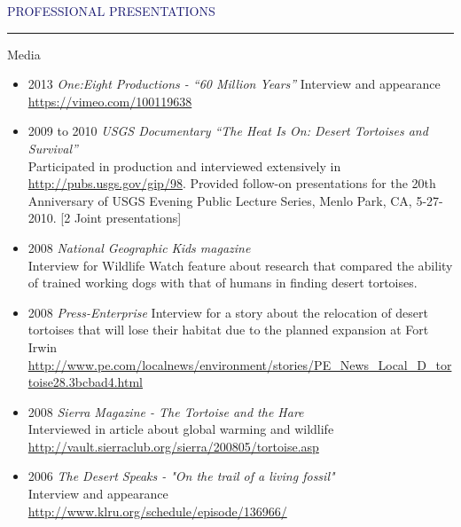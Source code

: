 \documentclass{resume} %
\renewenvironment{rSection}[1]{
\sectionskip
\textcolor{MidnightBlue}{\MakeUppercase{#1}}
\sectionlineskip
\hrule
\begin{list}{}{
\setlength{\leftmargin}{1.5em}
}
\item[]
}{
\end{list}
}
\begin{document}
\begin{rSection}{Professional Presentations}
\begin{rSubsection}{Media}{}{}{}
\begin{itemize}
\item 2013 \textit{One:Eight Productions - “60 Million Years”} Interview and appearance \\
\url{https://vimeo.com/100119638}
\item 2009 to 2010 \textit{USGS Documentary “The Heat Is On: Desert Tortoises and Survival”} \\Participated in production and interviewed extensively in \url{http://pubs.usgs.gov/gip/98}. Provided follow-on presentations for the 20th Anniversary of USGS Evening Public Lecture Series, Menlo Park, CA, 5-27-2010. [2 Joint presentations]
\item 2008 \textit{National Geographic Kids magazine} \\
Interview for Wildlife Watch feature about research that compared the ability of trained working dogs with that of humans in finding desert tortoises.
\item 2008 \textit{Press-Enterprise} Interview for a story about the relocation of desert tortoises that will lose their habitat due to the planned expansion at Fort Irwin \\ \url{http://www.pe.com/localnews/environment/stories/PE_News_Local_D_tortoise28.3bcbad4.html}
\item 2008\textit{ Sierra Magazine - The Tortoise and the Hare} \\
Interviewed in article about global warming and wildlife \\ \url{http://vault.sierraclub.org/sierra/200805/tortoise.asp}
\item 2006 \textit{The Desert Speaks - "On the trail of a living fossil"} \\ Interview and appearance \\
\url{http://www.klru.org/schedule/episode/136966/}
\end{itemize}

\end{rSubsection}

\end{rSection}
\end{document}
